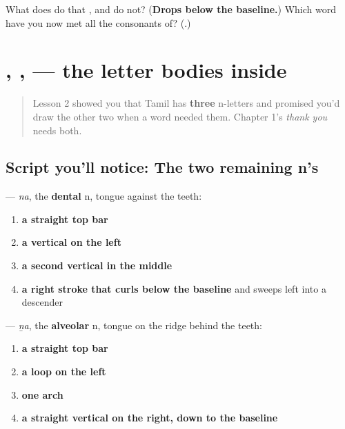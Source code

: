 \begin{tcolorbox}[breakable,colback=teal!4,colframe=teal!35!black,title={Before you move on}]
What does  do that ,  and  do not? (\textbf{Drops below the baseline.}) Which word have you now met all the consonants of? (\textbf{}.)
\end{tcolorbox}
\section[\texorpdfstring{\ta{ந}, \ta{ன}, \ta{ற} (na, ṉa, ṟa)}{ந, ன, ற (na, ṉa, ṟa)}]{, ,  — the letter bodies inside }

\label{lesson:TA-W04-vowel-signs-nandri}



\begin{quote}
Lesson 2 showed you that Tamil has \textbf{three} n-letters and promised you'd draw the other two when a word needed them. Chapter 1's \emph{thank you} needs both.
\end{quote}

\subsection*{Script you'll notice: The two remaining n's}

\textbf{} — \emph{na}, the \textbf{dental} n, tongue against the teeth:

\begin{enumerate}
\raggedright
  \item \textbf{a straight top bar}
  \item \textbf{a vertical on the left}
  \item \textbf{a second vertical in the middle}
  \item \textbf{a right stroke that curls below the baseline} and sweeps left into a descender
\end{enumerate}

\textbf{} — \emph{ṉa}, the \textbf{alveolar} n, tongue on the ridge behind the teeth:

\begin{enumerate}
\raggedright
  \item \textbf{a straight top bar}
  \item \textbf{a loop on the left}
  \item \textbf{one arch}
  \item \textbf{a straight vertical on the right, down to the baseline}
\end{enumerate}

